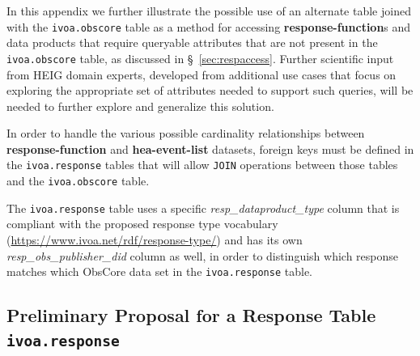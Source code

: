 In this appendix we further illustrate the possible use of an alternate table joined with the {\tt ivoa.obscore} table as a method for accessing {\bf response-function}s and data products that require queryable attributes that are not present in the {\tt ivoa.obscore} table,  as discussed in \S~\ref{sec:respaccess}. Further scientific input from \gls{HEIG} domain experts, developed from additional use cases that focus on exploring the appropriate set of attributes needed to support such queries, will be needed to further explore and generalize this solution.

In order to handle the various possible cardinality relationships between {\bf response-function} and {\bf hea-event-list}  datasets, foreign keys must be defined in the {\tt ivoa.response} tables that will allow {\tt  JOIN} operations between those tables and the {\tt ivoa.obscore} table.

The {\tt ivoa.response} table uses a specific {\em resp\_dataproduct\_type\/} column that is compliant with the proposed response type vocabulary (\url{https://www.ivoa.net/rdf/response-type/}) and has its own {\em resp\_obs\_publisher\_did\/} column as well, in order to distinguish which response matches  which ObsCore data set in the {\tt ivoa.response} table. 

\subsection*{Preliminary Proposal for a Response Table {\tt ivoa.response}}

